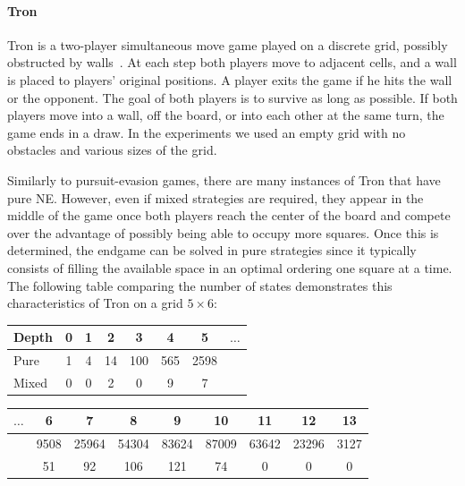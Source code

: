 \paragraph{\textbf{Tron}} 
Tron is a two-player simultaneous move game played on a discrete grid, possibly obstructed by 
walls~\cite{Samothrakis10Tron,Perick12Comparison,Lanctot13Tron}.
At each step both players move to adjacent cells, and a wall is placed to players' original positions.
A player exits the game if he hits the wall or the opponent.
The goal of both players is to survive as long as possible. 
If both players move into a wall, off the board, or into each other at the same turn, the game ends in a draw.
In the experiments we used an empty grid with no obstacles and various sizes of the grid.

Similarly to pursuit-evasion games, there are many instances of Tron that have pure NE.
However, even if mixed strategies are required, they appear in the middle of the game once both players reach the center of the board and compete over the advantage of possibly being able to occupy more squares.
Once this is determined, the endgame can be solved in pure strategies since it typically consists of filling the available space in an optimal ordering one square at a time.
The following table comparing the number of states demonstrates this characteristics of Tron on a grid $5\times6$:

\begin{table}[h!]
\centering
\small
\begin{flushleft}
\begin{tabular}{|l|c|c|c|c|c|c|c|}
\hline Depth & 0 & 1 & 2 & 3 & 4 & 5 & $\ldots$\\
\hline Pure  & 1 & 4 & 14 & 100 & 565 & 2598 & \\
\hline Mixed & 0 & 0 & 2 & 0 & 9 & 7 & \\
\hline
\end{tabular}
\end{flushleft}
\begin{flushright}
\begin{tabular}{|c|c|c|c|c|c|c|c|c|}
\hline  $\ldots$ & 6 & 7 & 8 & 9 & 10 & 11 & 12 & 13\\
\hline  & 9508 & 25964 & 54304 & 83624 & 87009 & 63642 & 23296 & 3127\\
\hline  & 51 & 92 & 106 & 121 & 74 & 0 & 0 & 0 \\
\hline
\end{tabular}
\end{flushright}
\end{table}


